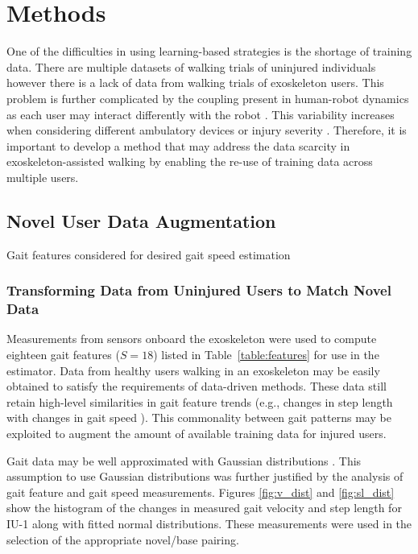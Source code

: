 \section{Methods}
One of the difficulties in using learning-based strategies is the shortage of training data. There are multiple datasets of walking trials of uninjured individuals \cite{hu2018benchmark,anguita2013public,fukuchi2018public} however there is a lack of data from walking trials of exoskeleton users. This problem is further complicated by the coupling present in human-robot dynamics as each user may interact differently with the robot \cite{sylla2014assessing}. This variability increases when considering different ambulatory devices \cite{gambon2019characterizing} or injury severity \cite{gambon2020effects, rota2011walk}. Therefore, it is important to develop a method that may address the data scarcity in exoskeleton-assisted walking by enabling the re-use of training data across multiple users.

\subsection{Novel User Data Augmentation}
\begin{table}
	\footnotesize
	\centering
	\caption{Gait features considered for desired gait speed estimation }\label{table:features}
	
\end{table}

\subsubsection{Transforming Data from Uninjured Users to Match Novel Data}
Measurements from sensors onboard the exoskeleton were used to compute eighteen gait features ($S=18$) listed in Table~\ref{table:features} for use in the estimator. Data from healthy users walking in an exoskeleton may be easily obtained to satisfy the requirements of data-driven methods. These data still retain high-level similarities in gait feature trends (e.g., changes in step length with changes in gait speed \cite{karulkar2021using}). This commonality between gait patterns may be exploited to augment the amount of available training data for injured users.

Gait data may be well approximated with Gaussian distributions \cite{austin2011disambiguation}. This assumption to use Gaussian distributions was further justified by the analysis of gait feature and gait speed measurements. Figures \ref{fig:v_dist} and \ref{fig:sl_dist} show the histogram of the changes in measured gait velocity and step length for IU-1 along with fitted normal distributions. These measurements were used in the selection of the appropriate novel/base pairing. 

